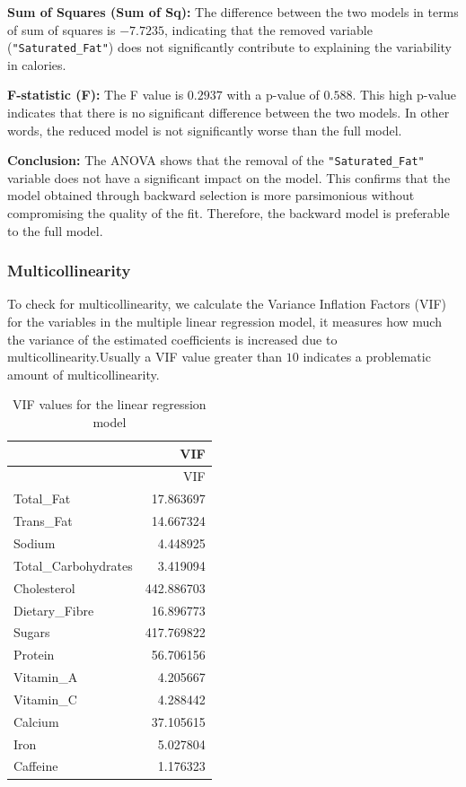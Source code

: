 \documentclass[
]{article}
\begin{document}
\textbf{Sum of Squares (Sum of Sq):} The difference between the two
models in terms of sum of squares is \(-7.7235\), indicating that the
removed variable (\texttt{"Saturated\_Fat"}) does not significantly
contribute to explaining the variability in calories.

\textbf{F-statistic (F):} The F value is \(0.2937\) with a p-value of
\(0.588\). This high p-value indicates that there is no significant
difference between the two models. In other words, the reduced model is
not significantly worse than the full model.

\textbf{Conclusion:} The ANOVA shows that the removal of the
\texttt{"Saturated\_Fat"} variable does not have a significant impact on
the model. This confirms that the model obtained through backward
selection is more parsimonious without compromising the quality of the
fit. Therefore, the backward model is preferable to the full model.

\subsubsection{Multicollinearity}\label{multicollinearity}

To check for multicollinearity, we calculate the Variance Inflation
Factors (VIF) for the variables in the multiple linear regression model,
it measures how much the variance of the estimated coefficients is
increased due to multicollinearity.Usually a VIF value greater than
\(10\) indicates a problematic amount of multicollinearity.

\begin{longtable}[]{@{}lr@{}}
\caption{VIF values for the linear regression model}\tabularnewline
\toprule\noalign{}
& VIF \\
\midrule\noalign{}
\endfirsthead
\toprule\noalign{}
& VIF \\
\midrule\noalign{}
\endhead
\bottomrule\noalign{}
\endlastfoot
Total\_Fat & 17.863697 \\
Trans\_Fat & 14.667324 \\
Sodium & 4.448925 \\
Total\_Carbohydrates & 3.419094 \\
Cholesterol & 442.886703 \\
Dietary\_Fibre & 16.896773 \\
Sugars & 417.769822 \\
Protein & 56.706156 \\
Vitamin\_A & 4.205667 \\
Vitamin\_C & 4.288442 \\
Calcium & 37.105615 \\
Iron & 5.027804 \\
Caffeine & 1.176323 \\
\end{longtable}
\end{document}
